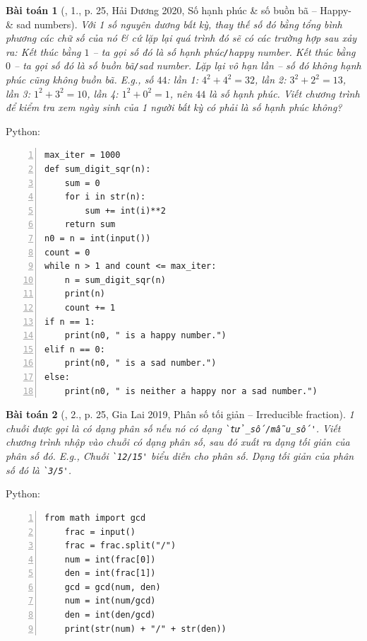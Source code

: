 \documentclass{article}
\newtheorem{baitoan}{Bài toán}
\begin{document}
\begin{baitoan}[\cite{VietSTEM2021}, 1., p. 25, Hải Dương 2020, Số hạnh phúc \& số buồn bã -- Happy- \& sad numbers]
	Với 1 số nguyên dương bất kỳ, thay thế số đó bằng tổng bình phương các chữ số của nó \& cứ lặp lại quá trình đó sẽ có các trường hợp sau xảy ra: Kết thúc bằng $1$ -- ta gọi số đó là \emph{số hạnh phúc\texttt{/}happy number}. Kết thúc bằng $0$ -- ta gọi số đó là \emph{số buồn bã\texttt{/}sad number}. Lặp lại vô hạn lần -- số đó không hạnh phúc cũng không buồn bã. E.g., số $44$: lần 1: $4^2 + 4^2 = 32$, lần 2: $3^2 + 2^2 = 13$, lần 3: $1^2 + 3^2 = 10$, lần 4: $1^2 + 0^2 = 1$, nên $44$ là số hạnh phúc. Viết chương trình để kiểm tra xem ngày sinh của 1 người bất kỳ có phải là số hạnh phúc không?
\end{baitoan}
Python:
\begin{Verbatim}[numbers=left,xleftmargin=5mm]
max_iter = 1000
def sum_digit_sqr(n):
    sum = 0 
    for i in str(n):
        sum += int(i)**2
    return sum
n0 = n = int(input())
count = 0
while n > 1 and count <= max_iter:
    n = sum_digit_sqr(n)
    print(n)
    count += 1
if n == 1:
    print(n0, " is a happy number.")
elif n == 0:
    print(n0, " is a sad number.")
else:
    print(n0, " is neither a happy nor a sad number.")
\end{Verbatim}

\begin{baitoan}[\cite{VietSTEM2021}, 2., p. 25, Gia Lai 2019, Phân số tối giản -- Irreducible fraction]
	1 chuỗi được gọi là có dạng phân số nếu nó có dạng \verb|`tử_số/mẫu_số'|. Viết chương trình nhập vào chuỗi có dạng phân số, sau đó xuất ra dạng tối giản của phân số đó. E.g., Chuỗi \verb|`12/15'| biểu diễn cho phân số. Dạng tối giản của phân số đó là \verb|`3/5'|.
\end{baitoan}
Python:
\begin{Verbatim}[numbers=left,xleftmargin=5mm]
	from math import gcd
	frac = input()
	frac = frac.split("/")
	num = int(frac[0])
	den = int(frac[1])
	gcd = gcd(num, den)
	num = int(num/gcd)
	den = int(den/gcd)
	print(str(num) + "/" + str(den))
\end{Verbatim}
\end{document}
